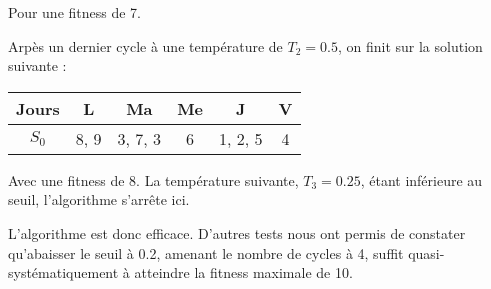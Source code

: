 {Pour une fitness de 7.

Arpès un dernier cycle à une température de $T_2 = 0.5$, on finit sur la solution suivante :


\begin{table}[!h]
    \centering
    \begin{tabular}{|c|c|c|c|c|c|}
        \hline
        Jours & L    & Ma    & Me   & J    & V    \\
        \hline
        $S_0$ & 8, 9 & 3, 7, 3 & 6 & 1, 2, 5 & 4 \\
        \hline
    \end{tabular}
\end{table}

Avec une fitness de 8. La température suivante, $T_3 = 0.25$, étant inférieure au seuil, l'algorithme s'arrête ici.

L'algorithme est donc efficace. D'autres tests nous ont permis de constater qu'abaisser le seuil à 0.2, amenant le nombre de cycles à 4, suffit quasi-systématiquement à atteindre la fitness maximale de 10.

}